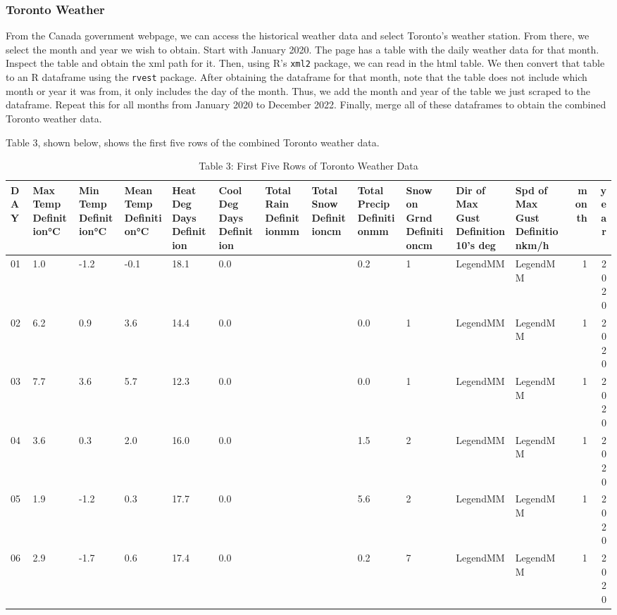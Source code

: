 \documentclass[
]{article}
\begin{document}
\hypertarget{toronto-weather}{%
\subsubsection{Toronto Weather}\label{toronto-weather}}

From the Canada government webpage, we can access the historical weather
data and select Toronto's weather station. From there, we select the
month and year we wish to obtain. Start with January 2020. The page has
a table with the daily weather data for that month. Inspect the table
and obtain the xml path for it. Then, using R's \texttt{xml2} package,
we can read in the html table. We then convert that table to an R
dataframe using the \texttt{rvest} package. After obtaining the
dataframe for that month, note that the table does not include which
month or year it was from, it only includes the day of the month. Thus,
we add the month and year of the table we just scraped to the dataframe.
Repeat this for all months from January 2020 to December 2022. Finally,
merge all of these dataframes to obtain the combined Toronto weather
data.

Table 3, shown below, shows the first five rows of the combined Toronto
weather data.

\begin{table}[!h]

\caption{\label{tab:Table 3 First Five Rows of Toronto Weather Data}Table 3: First Five Rows of Toronto Weather Data}
\centering
\begin{tabular}[t]{l|l|l|l|l|l|l|l|l|l|l|l|r|r}
\hline
DAY & Max Temp Definition°C & Min Temp Definition°C & Mean Temp Definition°C & Heat Deg Days Definition & Cool Deg Days Definition & Total Rain Definitionmm & Total Snow Definitioncm & Total Precip Definitionmm & Snow on Grnd Definitioncm & Dir of Max Gust Definition10's deg & Spd of Max Gust Definitionkm/h & month & year\\
\hline
01 & 1.0 & -1.2 & -0.1 & 18.1 & 0.0 &  &  & 0.2 & 1 & LegendMM & LegendMM & 1 & 2020\\
\hline
02 & 6.2 & 0.9 & 3.6 & 14.4 & 0.0 &  &  & 0.0 & 1 & LegendMM & LegendMM & 1 & 2020\\
\hline
03 & 7.7 & 3.6 & 5.7 & 12.3 & 0.0 &  &  & 0.0 & 1 & LegendMM & LegendMM & 1 & 2020\\
\hline
04 & 3.6 & 0.3 & 2.0 & 16.0 & 0.0 &  &  & 1.5 & 2 & LegendMM & LegendMM & 1 & 2020\\
\hline
05 & 1.9 & -1.2 & 0.3 & 17.7 & 0.0 &  &  & 5.6 & 2 & LegendMM & LegendMM & 1 & 2020\\
\hline
06 & 2.9 & -1.7 & 0.6 & 17.4 & 0.0 &  &  & 0.2 & 7 & LegendMM & LegendMM & 1 & 2020\\
\hline
\end{tabular}
\end{table}
\end{document}

